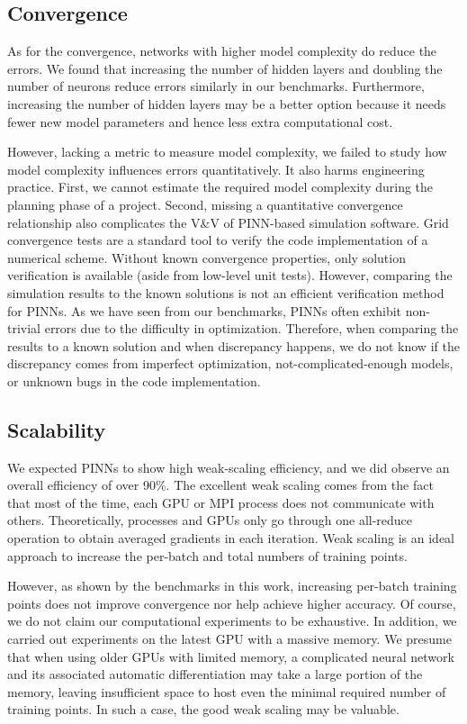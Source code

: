 \subsection*{Convergence}

As for the convergence, networks with higher model complexity do reduce the errors.
We found that increasing the number of hidden layers and doubling the number of neurons reduce errors similarly in our benchmarks.
Furthermore, increasing the number of hidden layers may be a better option because it needs fewer new model parameters and hence less extra computational cost.

However, lacking a metric to measure model complexity, we failed to study how model complexity influences errors quantitatively.
It also harms engineering practice. 
First, we cannot estimate the required model complexity during the planning phase of a project.
Second, missing a quantitative convergence relationship also complicates the V\&V of PINN-based simulation software.
Grid convergence tests are a standard tool to verify the code implementation of a numerical scheme.
Without known convergence properties, only solution verification is available (aside from low-level unit tests).
However, comparing the simulation results to the known solutions is not an efficient verification method for PINNs.
As we have seen from our benchmarks, PINNs often exhibit non-trivial errors due to the difficulty in optimization.
Therefore, when comparing the results to a known solution and when discrepancy happens, we do not know if the discrepancy comes from imperfect optimization, not-complicated-enough models, or unknown bugs in the code implementation.

\subsection*{Scalability}

We expected PINNs to show high weak-scaling efficiency, and we did observe an overall efficiency of over 90\%.
The excellent weak scaling comes from the fact that most of the time, each GPU or MPI process does not communicate with others.
Theoretically, processes and GPUs only go through one all-reduce operation to obtain averaged gradients in each iteration.
Weak scaling is an ideal approach to increase the per-batch and total numbers of training points.

However, as shown by the benchmarks in this work, increasing per-batch training points does not improve convergence nor help achieve higher accuracy.
Of course, we do not claim our computational experiments to be exhaustive.
In addition, we carried out experiments on the latest GPU with a massive memory.
We presume that when using older GPUs with limited memory, a complicated neural network and its associated automatic differentiation may take a large portion of the memory, leaving insufficient space to host even the minimal required number of training points.
In such a case, the good weak scaling may be valuable.


